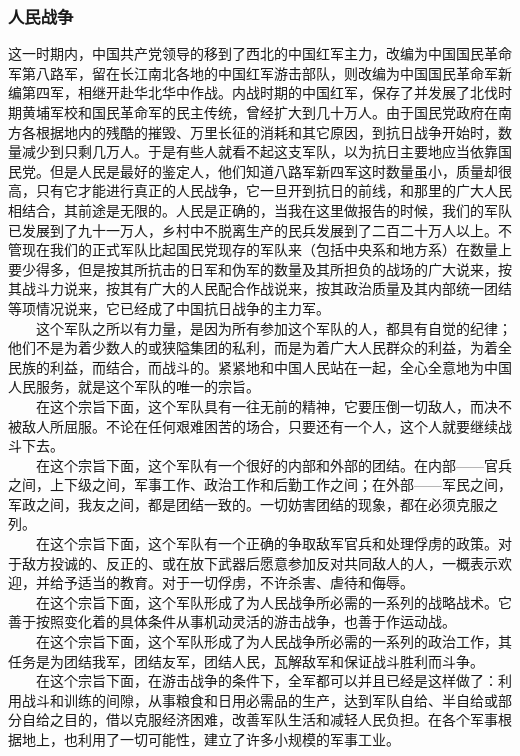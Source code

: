\documentclass[cn,11pt,chinese]{elegantbook}
\def\myformat#1{\hfil\hfil #1}
\begin{document}
\subsubsection*{\myformat{人民战争}}
这一时期内，中国共产党领导的移到了西北的中国红军主力，改编为中国国民革命军第八路军，留在长江南北各地的中国红军游击部队，则改编为中国国民革命军新编第四军，相继开赴华北华中作战。内战时期的中国红军，保存了并发展了北伐时期黄埔军校和国民革命军的民主传统，曾经扩大到几十万人。由于国民党政府在南方各根据地内的残酷的摧毁、万里长征的消耗和其它原因，到抗日战争开始时，数量减少到只剩几万人。于是有些人就看不起这支军队，以为抗日主要地应当依靠国民党。但是人民是最好的鉴定人，他们知道八路军新四军这时数量虽小，质量却很高，只有它才能进行真正的人民战争，它一旦开到抗日的前线，和那里的广大人民相结合，其前途是无限的。人民是正确的，当我在这里做报告的时候，我们的军队已发展到了九十一万人，乡村中不脱离生产的民兵发展到了二百二十万人以上。不管现在我们的正式军队比起国民党现存的军队来（包括中央系和地方系）在数量上要少得多，但是按其所抗击的日军和伪军的数量及其所担负的战场的广大说来，按其战斗力说来，按其有广大的人民配合作战说来，按其政治质量及其内部统一团结等项情况说来，它已经成了中国抗日战争的主力军。\\
　　这个军队之所以有力量，是因为所有参加这个军队的人，都具有自觉的纪律；他们不是为着少数人的或狭隘集团的私利，而是为着广大人民群众的利益，为着全民族的利益，而结合，而战斗的。紧紧地和中国人民站在一起，全心全意地为中国人民服务，就是这个军队的唯一的宗旨。\\
　　在这个宗旨下面，这个军队具有一往无前的精神，它要压倒一切敌人，而决不被敌人所屈服。不论在任何艰难困苦的场合，只要还有一个人，这个人就要继续战斗下去。\\
　　在这个宗旨下面，这个军队有一个很好的内部和外部的团结。在内部——官兵之间，上下级之间，军事工作、政治工作和后勤工作之间；在外部——军民之间，军政之间，我友之间，都是团结一致的。一切妨害团结的现象，都在必须克服之列。\\
　　在这个宗旨下面，这个军队有一个正确的争取敌军官兵和处理俘虏的政策。对于敌方投诚的、反正的、或在放下武器后愿意参加反对共同敌人的人，一概表示欢迎，并给予适当的教育。对于一切俘虏，不许杀害、虐待和侮辱。\\
　　在这个宗旨下面，这个军队形成了为人民战争所必需的一系列的战略战术。它善于按照变化着的具体条件从事机动灵活的游击战争，也善于作运动战。\\
　　在这个宗旨下面，这个军队形成了为人民战争所必需的一系列的政治工作，其任务是为团结我军，团结友军，团结人民，瓦解敌军和保证战斗胜利而斗争。\\
　　在这个宗旨下面，在游击战争的条件下，全军都可以并且已经是这样做了：利用战斗和训练的间隙，从事粮食和日用必需品的生产，达到军队自给、半自给或部分自给之目的，借以克服经济困难，改善军队生活和减轻人民负担。在各个军事根据地上，也利用了一切可能性，建立了许多小规模的军事工业。\\
\end{document}
